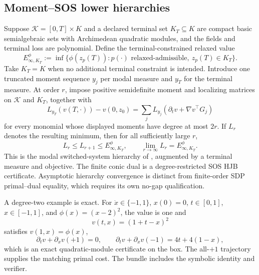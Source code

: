 \documentclass[twoside,11pt]{article}
\begin{document}
\subsection{Moment--SOS lower hierarchies}
\label{sec:sos-main}

Suppose $\mathcal K=[0,T]\times K$ and a declared terminal set
$K_T\subseteq K$ are compact basic semialgebraic sets with Archimedean
quadratic modules, and the fields and terminal loss are polynomial.  Define the
terminal-constrained relaxed value
\begin{equation}
 E_{\infty,K_T}^\phi
 :=\inf\{\phi(z_p(T)):p(\cdot)\text{ relaxed-admissible},\ z_p(T)\in K_T\}.
 \label{eq:terminal-constrained-floor-main}
\end{equation}
Take $K_T=K$ when no additional terminal constraint is intended.  Introduce
one truncated moment sequence $y_j$ per modal measure and $y_T$ for the
terminal measure.  At order $r$, impose positive semidefinite moment and
localizing matrices on $\mathcal K$ and $K_T$, together with
\begin{equation}
 L_{y_T}(v(T,\cdot))-v(0,z_0)
 =\sum_jL_{y_j}(\partial_tv+\nabla v^\top G_j)
 \label{eq:moment-liouville-main}
\end{equation}
for every monomial whose displayed moments have degree at most $2r$.  If $L_r$
denotes the resulting minimum, then for all sufficiently large $r$,
\begin{equation}
 L_r\le L_{r+1}\le E_{\infty,K_T}^\phi,
 \qquad
 \lim_{r\to\infty}L_r=E_{\infty,K_T}^\phi.
 \label{eq:sos-convergence-main}
\end{equation}
This is the modal switched-system hierarchy of
\citet{ClaeysDaafouzHenrion2016}, augmented by a terminal measure and
objective.  The finite conic dual is a degree-restricted SOS HJB certificate.
Asymptotic hierarchy convergence is distinct from finite-order SDP
primal--dual equality, which requires its own no-gap qualification.

A degree-two example is exact.  For $\dot x\in\{-1,1\}$, $x(0)=0$, $t\in[0,1]$, $x\in[-1,1]$, and $\phi(x)=(x-2)^2$, the value is one and
\begin{equation}
 v(t,x)=(1+t-x)^2
 \label{eq:exact-sos-witness-main}
\end{equation}
satisfies $v(1,x)=\phi(x)$,
\begin{equation}
 \partial_tv+\partial_xv(+1)=0,
 \qquad
 \partial_tv+\partial_xv(-1)=4t+4(1-x),
 \label{eq:exact-sos-residual-main}
\end{equation}
which is an exact quadratic-module certificate on the box.  The all-$+1$ trajectory supplies the matching primal cost.  The bundle includes the symbolic identity and verifier.
\end{document}
